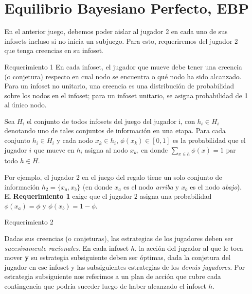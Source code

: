 \documentclass[12pt]{article}
\begin{document}




\section{Equilibrio Bayesiano Perfecto, EBP}


En el anterior juego, debemos poder aislar al jugador 2 en cada uno de sus infosets incluso si no inicia un subjuego. Para esto, requeriremos del jugador 2 que tenga creencias en su infoset.

\begin{mybox}{Requerimiento 1}
	En cada infoset, el jugador que mueve debe tener una creencia (o conjetura) respecto en cual nodo se encuentra o qué nodo ha sido alcanzado. Para un infoset no unitario, una creencia es una distribución de probabilidad sobre los nodos en el infoset; para un infoset unitario, se asigna probabilidad de 1 al único nodo.
\end{mybox}

Sea $ H_i $ el conjunto de todos infosets del juego del jugador i, con $ h_i \in H_i $ denotando uno de tales conjuntos de información en una etapa. Para cada conjunto $ h_i \in H_i $ y cada nodo $ x_k \in h_i $, $ \phi(x_k) \in [0, 1] $ es la probabilidad que el jugador $ i $ que mueve en $ h_i $ asigna al nodo $ x_k $, en donde $ \sum_{x\in h} \phi(x)=1$ par todo $ h \in H $.

Por ejemplo, el jugador 2 en el juego del regalo tiene un solo conjunto de información $ h_2 = \{x_a, x_b\} $ (en donde $ x_a $ es el nodo \textit{arriba} y $ x_b $ es el nodo \textit{abajo}). El \textbf{Requerimiento 1} exige que el jugador 2 asigna una probabilidad $ \phi(x_a) = \phi $ y $ \phi(x_b) = 1-\phi $.

\begin{mybox}{Requerimiento 2}

	Dadas sus creencias (o conjeturas), las estrategias de los jugadores deben ser \textit{sucesivamente racionales}. En cada infoset $ h $, la acción del jugador al que le toca mover \textbf{y} su estrategia subsiguiente deben ser óptimas, dada la conjetura del jugador en ese infoset y las subsiguientes estrategias de los \textit{demás jugadores}. Por estrategia subsiguiente nos referimos a un plan de acción que cubre cada contingencia que podría suceder luego de haber alcanzado el infoset $ h $.

\end{mybox}
\end{document}
